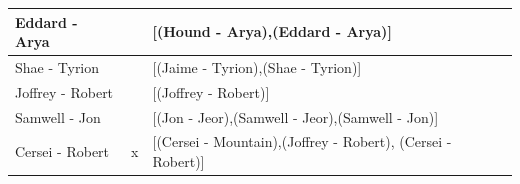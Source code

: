 \documentclass[10pt,a4paper]{article}
\begin{document}
\begin{enumerate}
\begin{table}[H]
\begin{tabular}{|l|l|l|}
		Eddard - Arya     &       & {[}(Hound - Arya),(Eddard - Arya){]}                                                                                                                                                                                                                                                                                                                                                                                                                                                                 \\ \hline
		Shae - Tyrion     &       & {[}(Jaime - Tyrion),(Shae - Tyrion){]}                                                                                                                                                                                                                                                                                                                                                                                                                                                               \\ \hline
		Joffrey - Robert  &       & {[}(Joffrey - Robert){]}                                                                                                                                                                                                                                                                                                                                                                                                                                                                             \\ \hline
		Samwell - Jon     &       & {[}(Jon - Jeor),(Samwell - Jeor),(Samwell - Jon){]}                                                                                                                                                                                                                                                                                                                                                                                                                                                  \\ \hline
		Cersei - Robert   & x     & {[}(Cersei - Mountain),(Joffrey - Robert), (Cersei - Robert){]}                                                                                                                                                                                                                                                                                                                                                                                                                                      \\ \hline

\end{tabular}
\end{table}
\end{enumerate}
\end{document}
